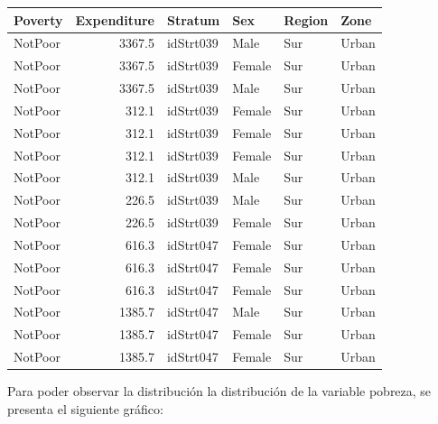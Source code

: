 \documentclass[
  12pt,
]{book}
\begin{document}
\begin{tabular}{l|r|l|l|l|l}
\hline
Poverty & Expenditure & Stratum & Sex & Region & Zone\\
\hline
NotPoor & 3367.5 & idStrt039 & Male & Sur & Urban\\
\hline
NotPoor & 3367.5 & idStrt039 & Female & Sur & Urban\\
\hline
NotPoor & 3367.5 & idStrt039 & Male & Sur & Urban\\
\hline
NotPoor & 312.1 & idStrt039 & Female & Sur & Urban\\
\hline
NotPoor & 312.1 & idStrt039 & Female & Sur & Urban\\
\hline
NotPoor & 312.1 & idStrt039 & Female & Sur & Urban\\
\hline
NotPoor & 312.1 & idStrt039 & Male & Sur & Urban\\
\hline
NotPoor & 226.5 & idStrt039 & Male & Sur & Urban\\
\hline
NotPoor & 226.5 & idStrt039 & Female & Sur & Urban\\
\hline
NotPoor & 616.3 & idStrt047 & Female & Sur & Urban\\
\hline
NotPoor & 616.3 & idStrt047 & Female & Sur & Urban\\
\hline
NotPoor & 616.3 & idStrt047 & Female & Sur & Urban\\
\hline
NotPoor & 1385.7 & idStrt047 & Male & Sur & Urban\\
\hline
NotPoor & 1385.7 & idStrt047 & Female & Sur & Urban\\
\hline
NotPoor & 1385.7 & idStrt047 & Female & Sur & Urban\\
\hline
\end{tabular}

Para poder observar la distribución la distribución de la variable pobreza, se presenta el siguiente gráfico:
\end{document}
